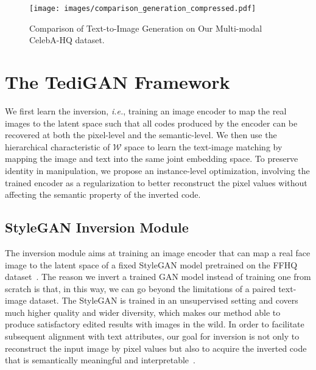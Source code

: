 \documentclass[final]{cvpr}
\newcommand{\W}{\mathcal{W}}
\def\ie{\emph{i.e.}}
\begin{document}
\begin{figure*}[ht]
\centering
\texttt{[image: images/comparison\_generation\_compressed.pdf]}
\caption{Comparison of Text-to-Image Generation on Our Multi-modal CelebA-HQ dataset.}
\label{fig:comp_gen}
\end{figure*}

\section{The TediGAN Framework}
\label{sec:method}
We first learn the inversion, \ie, training an image encoder to map the real images to the latent space such that all codes produced by the encoder can be recovered at both the pixel-level and the semantic-level. 
We then use the hierarchical characteristic of $\W$ space to learn the text-image matching by mapping the image and text into the same joint embedding space.
To preserve identity in manipulation, we propose an instance-level optimization, involving the trained encoder as a regularization to better reconstruct the pixel values without affecting the semantic property of the inverted code. 

\subsection{StyleGAN Inversion Module}
\label{subsec:gan-inversion}
The inversion module aims at training an image encoder that can map a real face image to the latent space of a fixed StyleGAN model pretrained on the FFHQ dataset~\cite{karras2019style}.
The reason we invert a trained GAN model instead of training one from scratch is that, in this way, we can go beyond the limitations of a paired text-image dataset. 
The StyleGAN is trained in an unsupervised setting and covers much higher quality and wider diversity, which makes our method able to produce satisfactory edited results with images in the wild. 
In order to facilitate subsequent alignment with text attributes, our goal for inversion is not only to reconstruct the input image by pixel values but also to acquire the inverted code that is semantically meaningful and interpretable~\cite{shen2020interpreting,yang2019semantic}.
\end{document}
